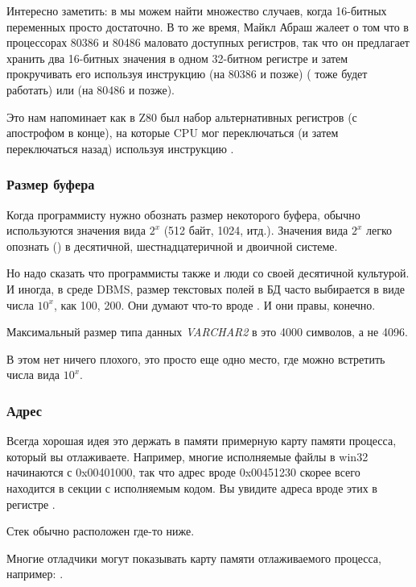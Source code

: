 Интересно заметить: в 
мы можем найти множество случаев, когда 16-битных переменных просто достаточно.
В то же время, Майкл Абраш жалеет о том что в процессорах 80386 и 80486 маловато доступных регистров,
так что он предлагает хранить два 16-битных значения в одном 32-битном регистре и затем прокручивать его 
используя инструкцию  (на 80386 и позже) ( тоже будет работать) или
 (на 80486 и позже).

Это нам напоминает как в Z80 был набор альтернативных регистров (с апострофом в конце), на которые CPU мог переключаться
(и затем переключаться назад) используя инструкцию .

\subsubsection{Размер буфера}

Когда программисту нужно обознать размер некоторого буфера, обычно используются значения вида $2^x$ (512 байт, 1024, итд.).
Значения вида $2^x$ легко опознать () в десятичной, шестнадцатеричной и двоичной системе.

Но надо сказать что программисты также и люди со своей десятичной культурой.
И иногда, в среде \ac{DBMS}, размер текстовых полей в БД часто выбирается в виде числа $10^x$, как 100, 200.
Они думают что-то вроде .
И они правы, конечно.

Максимальный размер типа данных \emph{VARCHAR2} в \oracle это 4000 символов, а не 4096.

В этом нет ничего плохого, это просто еще одно место, где можно встретить числа вида $10^x$.

\subsubsection{Адрес}

Всегда хорошая идея это держать в памяти примерную карту памяти процесса, который вы отлаживаете.
Например, многие исполняемые файлы в win32 начинаются с 0x00401000, так что адрес вроде 0x00451230 скорее всего находится в секции с исполняемым кодом.
Вы увидите адреса вроде этих в регистре .

Стек обычно расположен где-то ниже. %

Многие отладчики могут показывать карту памяти отлаживаемого процесса, например: .

